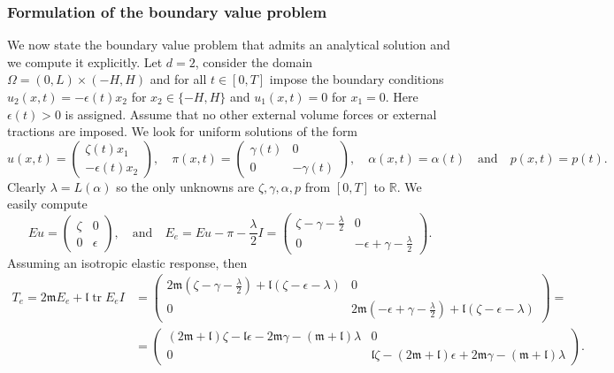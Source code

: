 \documentclass[a4paper,10pt,twoside]{amsbook}
\numberwithin{section}{chapter}
\numberwithin{equation}{chapter}
\theoremstyle{definition}
\DeclareMathOperator{\tr}{tr}
\begin{document}
\subsubsection*{Formulation of the boundary value problem} We now state the boundary value problem that admits an analytical solution and we compute it explicitly. Let $d=2$, consider the domain $\Omega=(0,L)\times(-H,H)$ and for all $t\in[0,T]$ impose the boundary conditions $u_2(x,t)=-\epsilon(t)x_2$ for $x_2\in\{-H,H\}$ and $u_1(x,t)=0$ for $x_1=0$. Here $\epsilon(t)>0$ is assigned. Assume that no other external volume forces or external tractions are imposed. We look for uniform solutions of the form
\[
u(x,t)=\begin{pmatrix}
\zeta(t)x_1 \\
-\epsilon(t)x_2
\end{pmatrix},\quad\pi(x,t)=\begin{pmatrix}
\gamma(t) & 0 \\
0 & -\gamma(t)
\end{pmatrix},\quad\alpha(x,t)=\alpha(t)\quad\text{and}\quad p(x,t)=p(t).
\]
Clearly $\lambda=L(\alpha)$ so the only unknowns are $\zeta,\gamma,\alpha,p$ from $[0,T]$ to $\mathbb{R}$. We easily compute
\[
Eu=\begin{pmatrix}
\zeta & 0 \\
0 & \epsilon
\end{pmatrix},
\quad\text{and}\quad
E_e=Eu-\pi-\frac{\lambda}{2}I=\begin{pmatrix}
\zeta-\gamma-\frac{\lambda}{2} & 0 \\
0 & -\epsilon+\gamma-\frac{\lambda}{2}
\end{pmatrix}.
\]
Assuming an isotropic elastic response, then
\[
\begin{split}
T_e=2\mathfrak{m} E_e+\mathfrak{l}\tr E_e I&=
\begin{pmatrix}
2\mathfrak{m}\left(\zeta-\gamma-\frac{\lambda}{2}\right)+\mathfrak{l}(\zeta-\epsilon-\lambda) & 0 \\
0 & 2\mathfrak{m}\left(-\epsilon+\gamma-\frac{\lambda}{2}\right)+\mathfrak{l}(\zeta-\epsilon-\lambda)
\end{pmatrix}=\\
&=\begin{pmatrix}
(2\mathfrak{m}+\mathfrak{l})\zeta-\mathfrak{l}\epsilon-2\mathfrak{m}\gamma-(\mathfrak{m}+\mathfrak{l})\lambda & 0 \\
0 & \mathfrak{l}\zeta-(2\mathfrak{m}+\mathfrak{l})\epsilon+2\mathfrak{m}\gamma-(\mathfrak{m}+\mathfrak{l})\lambda
\end{pmatrix}.
\end{split}
\]
\end{document}
